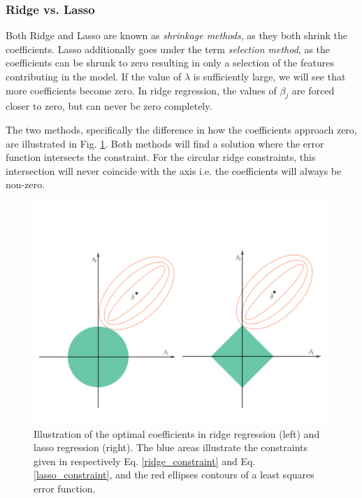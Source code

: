 \subsubsection{Ridge vs. Lasso}
Both Ridge and Lasso are known as \textit{shrinkage methods}, as they both shrink the coefficients. Lasso additionally goes under the term \textit{selection method}, as the coefficients can be shrunk to zero resulting in only a selection of the features contributing in the model. 
If the value of $\lambda$ is sufficiently large, we will see that more coefficients become zero. 
In ridge regression, the values of $\beta_j$ are forced closer to zero, but can never be zero completely. 

The two methods, specifically the difference in how the coefficients approach zero, are illustrated in Fig. \ref{fig:ridge_lasso}. Both methods will find a solution where the error function intersects the constraint. For the circular ridge constraints, this intersection will never coincide with the axis i.e. the coefficients will always be non-zero. 

\begin{figure}[h!]
    \centering
    \includegraphics[width=1\linewidth]{project_1/figures/ridge-lasso.png}
    \caption{Illustration of the optimal coefficients in ridge regression (left) and lasso regression (right). The blue areas illustrate the constraints given in respectively Eq. \ref{ridge_constraint} and Eq. \ref{lasso_constraint}, and the red ellipses contours of a least squares error function. \cite[Taken from][]{hastie}}
    \label{fig:ridge_lasso}
\end{figure}



